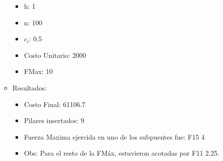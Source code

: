 \begin{itemize}
\begin{itemize}
\begin{itemize}
	    \item h: 1
	    \item n: 100
	    \item $c_i$: 0.5
	    \item Costo Unitario: 2000
	    \item FMax: 10
	  \end{itemize}
      \item Resultados:
	  \begin{itemize}
	    \item Costo Final: 61106.7
	    \item Pilares insertados: 9
	    \item Fuerza Maxima ejercida en uno de los subpuentes fue: F15 4
	    \item Obs: Para el resto de la FM\'ax, estuvieron acotadas por F11 2.25.
	  \end{itemize}
      \end{itemize}
\end{itemize}
